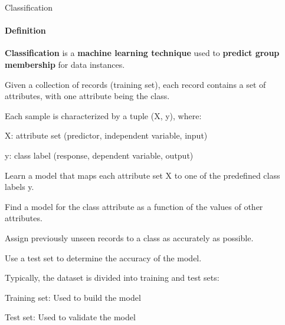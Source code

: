 \documentclass[aspectratio=169]{beamer}
\begin{document}
\begin{frame}{Classification}
    \framesubtitle{Definition}
    \small\centering\textbf{Classification} is a \textbf{machine learning technique} used to \textbf{predict group membership} for data instances.

    \vspace{0.3cm}
    \begin{coloredblock}
        \vspace{0.2cm}
        \begin{tugitemize}
            \item \scriptsize Given a collection of records (training set), each record contains a set of attributes, with one attribute being the class.
            \item \scriptsize Each sample is characterized by a tuple (X, y), where:
            \item \scriptsize X: attribute set (predictor, independent variable, input)
            \item \scriptsize y: class label (response, dependent variable, output)
        \end{tugitemize}
    \end{coloredblock}

    \vspace{0.2cm}

    \begin{coloredblock}
        \vspace{0.2cm}
        \begin{tugitemize}
            \item \scriptsize Learn a model that maps each attribute set X to one of the predefined class labels y.
            \item \scriptsize Find a model for the class attribute as a function of the values of other attributes.
        \end{tugitemize}
    \end{coloredblock}

    \vspace{0.2cm}

    \begin{coloredblock}
        \vspace{0.2cm}
        \begin{tugitemize}
            \item \scriptsize Assign previously unseen records to a class as accurately as possible.
            \item \scriptsize Use a test set to determine the accuracy of the model.
            \item \scriptsize Typically, the dataset is divided into training and test sets:
            \item \scriptsize Training set: Used to build the model
            \item \scriptsize Test set: Used to validate the model
        \end{tugitemize}
    \end{coloredblock}

\end{frame}
\end{document}
